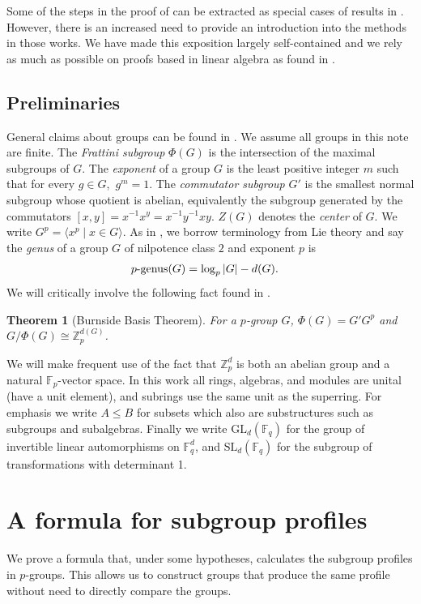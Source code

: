 \documentclass{toc}
\numberwithin{equation}{section}
\theoremstyle{plain}       %
\newtheorem{thm}[equation]{Theorem}
\theoremstyle{remark}
\theoremstyle{definition}
\numberwithin{figure}{section}
\numberwithin{table}{section}
\newcommand{\bbF}{\mathbb{F}}  %
\begin{document}
Some of the steps in the proof of  
can be extracted as
special cases of results in \cite{LW, BW:autotopism, BMW}. However, there is an
increased need to provide an introduction into the methods in those works.  We
have made this exposition largely self-contained and we rely as much as possible
on proofs based in linear algebra as found in \cite{JacII}.



\subsection*{Preliminaries}
General claims about groups can be found in \cite{Robinson}.  We assume all
groups in this note are finite.  The \emph{Frattini subgroup} $\Phi(G)$ is the
intersection of the maximal subgroups of $G$.  The \emph{exponent} of a group
$G$ is the least positive integer $m$ such that for every $g\in G$,\  $g^m=1$.
The \emph{commutator subgroup} $G'$ is the smallest normal subgroup whose
quotient is abelian, equivalently the subgroup generated by the commutators
$[x,y]=x^{-1}x^y=x^{-1}y^{-1}xy$. $Z(G)$ denotes the \emph{center} of $G$.  We
write $G^p=\langle x^p\mid x\in G\rangle$. As in \cite{BMW}, we borrow
terminology from Lie theory and say the \emph{genus} of a group $G$ of
nilpotence class $2$ and exponent $p$ is
\begin{align}\label{def:genus}
	\textnormal{$p$-genus}(G) & =\log_p |G| - d(G).
\end{align}
We will critically involve the following fact found in \cite[p. 140]{Robinson}.

\begin{thm}[Burnside Basis Theorem]
For a  $p$-group $G$, $\Phi(G)=G' G^p$ and $G/\Phi(G)\cong \mathbb{Z}_p^{d(G)}$.
\end{thm}


We will make frequent use of the fact that $\mathbb{Z}_p^d$ is both an abelian
group and a natural $\bbF_p$-vector space.  In this work all rings, algebras,
and modules are unital (have a unit element), and subrings use the same unit as
the superring.  For emphasis we write $A\leq B$ for subsets which also are
substructures such as subgroups and subalgebras.  Finally we write
$\mathrm{GL}_d(\bbF_q)$ for the group of invertible linear automorphisms on
$\bbF_q^d$, and $\mathrm{SL}_d(\bbF_q)$ for the subgroup of transformations with
determinant 1.


\section{A formula for subgroup profiles}
We prove a formula that, under some hypotheses, calculates the subgroup profiles
in $p$-groups. This allows us to construct groups that produce the same profile
without need to directly compare the groups.
\end{document}
